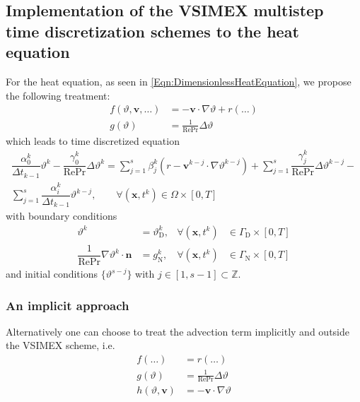 \documentclass[]{scrartcl}
\newcommand{\bs}[1]{\boldsymbol{#1}}
\begin{document}
\subsection{Implementation of the VSIMEX multistep time discretization schemes to the heat equation}\label{Sec:TimeDiscretizationHeatEquation}
For the heat equation, as seen in \cref{Eqn:DimensionlessHeatEquation}, we propose the following treatment:
\begin{equation*}
	\begin{aligned}
		f(\vartheta, \bs{v}, \dots) &= -\bs{v} \cdot \nabla \vartheta + r(\dots) \\
		g(\vartheta) &= \frac{1}{\textrm{Re}\textrm{Pr}} \Delta \vartheta
	\end{aligned}
\end{equation*}
which leads to time discretized equation
\begin{equation}
	\begin{split}\label{Eqn:VSIMEXHeatEquation}
		\dfrac{\alpha_0^k}{\Delta t_{k-1}} \vartheta^{k} -\dfrac{\gamma_0^k}{\textrm{Re}\textrm{Pr}} \Delta \vartheta^{k} = \sum_{j=1}^{s} \beta_j^k \left(r - \bs{v}^{k-j} \cdot \nabla \vartheta^{k-j}\right) + 
		\sum_{j=1}^{s} \dfrac{\gamma_j^k}{\textrm{Re}\textrm{Pr}} \Delta \vartheta^{k-j} - \\  \sum_{j=1}^{s} \dfrac{\alpha_i^k}{\Delta t_{k-1}}\vartheta^{k-j}, \qquad \forall(\bs{x},t^k)\in \Omega \times [0, T]
	\end{split}
\end{equation}
with boundary conditions
\begin{equation*}
\begin{aligned}
\vartheta^{k} &= \vartheta_\textrm{D}^k, &\forall(\bs{x}, t^k) &\in \Gamma_\textrm{D} \times [0, T] \\
\dfrac{1}{\textrm{Re}\textrm{Pr}}\nabla \vartheta^k \cdot \bs{n} &= g_\textrm{N}^k,  &\forall(\bs{x}, t^k) &\in \Gamma_\textrm{N} \times [0, T]
\end{aligned}
\end{equation*}
and initial conditions $\lbrace\vartheta^{s-j} \rbrace$ with $j \in [1, s-1]\subset \mathbb{Z}$.
\subsubsection{An implicit approach}\label{Sec:HeatEquationImplicit}
Alternatively one can choose to treat the advection term implicitly and outside the VSIMEX scheme, i.e.
\begin{equation*}
\begin{aligned}
f(\dots) &= r(\dots) \\
g(\vartheta) &= \frac{1}{\textrm{Re}\textrm{Pr}} \Delta \vartheta \\
h(\vartheta, \bs{v}) &= -\bs{v} \cdot \nabla \vartheta 
\end{aligned}
\end{equation*}
\end{document}
